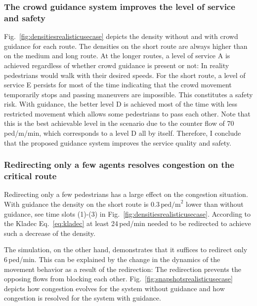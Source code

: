 \subsubsection{The crowd guidance system improves the level of service and safety}
Fig.~\ref{fig:densitiesrealisticusecase} depicts the density without and with crowd guidance for each route. The densities on the short route are always higher than on the medium and long route.  At the longer routes, a level of service A is achieved regardless of whether crowd guidance is present or not: In reality pedestrians would walk with their desired speeds.
For the short route, a level of service E persists for most of the time indicating that the crowd movement temporarily stops and passing maneuvers are impossible. This constitutes a safety risk. With guidance, the better level D is achieved most of the time with less restricted movement which allows some pedestrians to pass each other. Note that this is the best achievable level in the scenario due to the counter flow of 70\,ped/m/min, which corresponds to a level D all by itself. Therefore, I conclude that the proposed guidance system improves the service quality and safety. 

\subsubsection{Redirecting only a few agents resolves congestion on the critical route}

Redirecting only a few pedestrians has a large effect on the congestion situation. With guidance the density on the short route is \textrm{$0.3\,\text{ped/m}^2$} lower than without guidance, see time slots (1)-(3) in Fig.~\ref{fig:densitiesrealisticusecase}. According to the Kladec Eq.~\eqref{eq:kladec} at least 24\,ped/min needed to be redirected to achieve such a decrease of the density.

The simulation, on the other hand, demonstrates that it suffices to redirect only 6\,ped/min. This can be explained by the change in the dynamics of the movement behavior as a result of the redirection: The redirection prevents the opposing flows from blocking each other. Fig.~\ref{fig:snapshotsrealisticusecase} depicts how congestion evolves for the system without guidance and how congestion is resolved for the system with guidance. 



